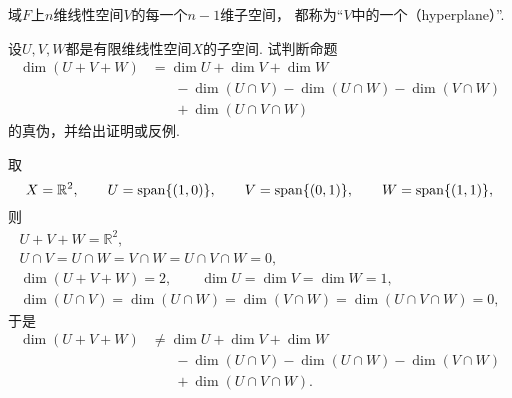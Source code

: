 \begin{definition}
域\(F\)上\(n\)维线性空间\(V\)的每一个\(n-1\)维子空间，
都称为“\(V\)中的一个（hyperplane）”.
\end{definition}

\begin{example}
设\(U,V,W\)都是有限维线性空间\(X\)的子空间.
试判断命题\begin{align*}
	\dim(U+V+W)
	&= \dim U + \dim V + \dim W \\
	&\hspace{20pt} - \dim(U \cap V) - \dim (U \cap W) - \dim(V \cap W) \\
	&\hspace{20pt} + \dim(U \cap V \cap W)
\end{align*}
的真伪，并给出证明或反例.
\begin{solution}
取\begin{equation*}
	X = \mathbb{R}^2,
	\qquad
	U = \operatorname{span}\{(1,0)\},
	\qquad
	V = \operatorname{span}\{(0,1)\},
	\qquad
	W = \operatorname{span}\{(1,1)\},
\end{equation*}
则\begin{gather*}
	U + V + W = \mathbb{R}^2, \\
	U \cap V
	= U \cap W
	= V \cap W
	= U \cap V \cap W
	= 0, \\
	\dim(U + V + W) = 2,
	\qquad
	\dim U = \dim V = \dim W = 1, \\
	\dim(U \cap V)
	= \dim(U \cap W)
	= \dim(V \cap W)
	= \dim(U \cap V \cap W)
	= 0,
\end{gather*}
于是\begin{align*}
	\dim(U+V+W)
	&\neq \dim U + \dim V + \dim W \\
	&\hspace{20pt} - \dim(U \cap V) - \dim (U \cap W) - \dim(V \cap W) \\
	&\hspace{20pt} + \dim(U \cap V \cap W).
\end{align*}
\end{solution}
\end{example}

